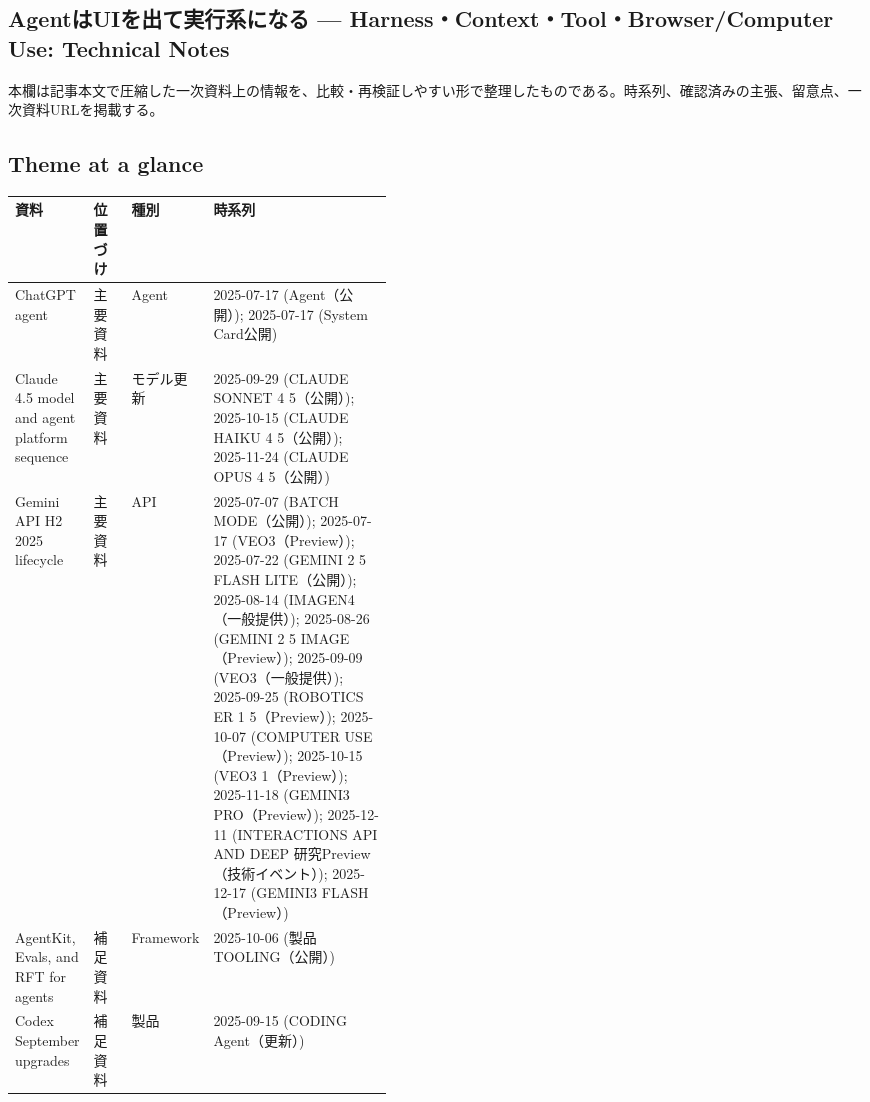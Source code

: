 \subsection*{AgentはUIを出て実行系になる — Harness・Context・Tool・Browser/Computer Use: Technical Notes}
本欄は記事本文で圧縮した一次資料上の情報を、比較・再検証しやすい形で整理したものである。時系列、確認済みの主張、留意点、一次資料URLを掲載する。
\medskip
\subsection*{Theme at a glance}
\begin{center}
\footnotesize
\begin{tabularx}{\linewidth}{@{}p{0.20\linewidth}p{0.10\linewidth}p{0.14\linewidth}X@{}}
\toprule
資料 & 位置づけ & 種別 & 時系列 \\
\midrule
ChatGPT agent & 主要資料 & Agent & 2025-07-17 (Agent（公開）); 2025-07-17 (System Card公開)  \\
Claude 4.5 model and agent platform sequence & 主要資料 & モデル更新 & 2025-09-29 (CLAUDE SONNET 4 5（公開）); 2025-10-15 (CLAUDE HAIKU 4 5（公開）); 2025-11-24 (CLAUDE OPUS 4 5（公開）)  \\
Gemini API H2 2025 lifecycle & 主要資料 & API & 2025-07-07 (BATCH MODE（公開）); 2025-07-17 (VEO3（Preview）); 2025-07-22 (GEMINI 2 5 FLASH LITE（公開）); 2025-08-14 (IMAGEN4（一般提供）); 2025-08-26 (GEMINI 2 5 IMAGE（Preview）); 2025-09-09 (VEO3（一般提供）); 2025-09-25 (ROBOTICS ER 1 5（Preview）); 2025-10-07 (COMPUTER USE（Preview）); 2025-10-15 (VEO3 1（Preview）); 2025-11-18 (GEMINI3 PRO（Preview）); 2025-12-11 (INTERACTIONS API AND DEEP 研究Preview（技術イベント）); 2025-12-17 (GEMINI3 FLASH（Preview）)  \\
AgentKit, Evals, and RFT for agents & 補足資料 & Framework & 2025-10-06 (製品 TOOLING（公開）)  \\
Codex September upgrades & 補足資料 & 製品 & 2025-09-15 (CODING Agent（更新）)  \\
\bottomrule
\end{tabularx}
\end{center}
\normalsize

